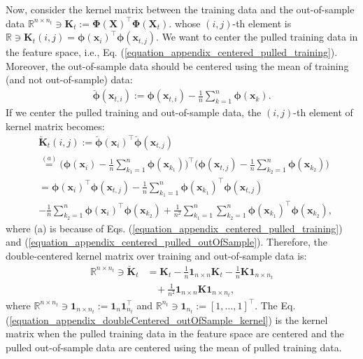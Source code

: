 \documentclass[lang=cn,10pt]{gorgeousnbook}
\numberwithin{equation}{section}%
\numberwithin{figure}{section}%
\begin{document}
Now, consider the kernel matrix between the training data and the out-of-sample data $\mathbb{R}^{n \times n_t} \ni \boldsymbol{K}_t := \boldsymbol{\Phi}(\boldsymbol{X})^\top \boldsymbol{\Phi}(\boldsymbol{X}_t)$.
whose $(i,j)$-th element is $\mathbb{R} \ni \boldsymbol{K}_t(i,j) = \boldsymbol{\phi}(\boldsymbol{x}_{i})^\top \boldsymbol{\phi}(\boldsymbol{x}_{t,j})$.
We want to center the pulled training data in the feature space, i.e., Eq. (\ref{equation_appendix_centered_pulled_training}). Moreover, the out-of-sample data should be centered using the mean of training (and not out-of-sample) data:
\begin{align}\label{equation_appendix_centered_pulled_outOfSample}
\breve{\boldsymbol{\phi}}(\boldsymbol{x}_{t,i}) := \boldsymbol{\phi}(\boldsymbol{x}_{t,i}) - \frac{1}{n} \sum_{k=1}^n \boldsymbol{\phi}(\boldsymbol{x}_k).
\end{align}
If we center the pulled training and out-of-sample data, the $(i,j)$-th element of kernel matrix becomes:
\begin{align*}
&\breve{\boldsymbol{K}}_t(i,j) := \breve{\boldsymbol{\phi}}(\boldsymbol{x}_i)^\top \breve{\boldsymbol{\phi}}(\boldsymbol{x}_{t,j}) \\
&\overset{(a)}{=} \! \big(\boldsymbol{\phi}(\boldsymbol{x}_i) - \frac{1}{n} \sum_{k_1=1}^n \boldsymbol{\phi}(\boldsymbol{x}_{k_1})\big)^\top \! \big(\boldsymbol{\phi}(\boldsymbol{x}_{t,j}) - \frac{1}{n} \sum_{k_2=1}^n \boldsymbol{\phi}(\boldsymbol{x}_{k_2})\big) \\
&= \boldsymbol{\phi}(\boldsymbol{x}_i)^\top \boldsymbol{\phi}(\boldsymbol{x}_{t,j}) - \frac{1}{n} \sum_{k_1=1}^n \boldsymbol{\phi}(\boldsymbol{x}_{k_1})^\top \boldsymbol{\phi}(\boldsymbol{x}_{t,j}) \\
& - \frac{1}{n} \sum_{k_2=1}^n \boldsymbol{\phi}(\boldsymbol{x}_i)^\top \boldsymbol{\phi}(\boldsymbol{x}_{k_2}) + \frac{1}{n^2} \! \sum_{k_1=1}^n  \sum_{k_2=1}^n \boldsymbol{\phi}(\boldsymbol{x}_{k_1})^\top \! \boldsymbol{\phi}(\boldsymbol{x}_{k_2}),
\end{align*}
where (a) is because of Eqs. (\ref{equation_appendix_centered_pulled_training}) and (\ref{equation_appendix_centered_pulled_outOfSample}).
Therefore, the double-centered kernel matrix over training and out-of-sample data is:
\begin{align}
\mathbb{R}^{n \times n_t} \ni \breve{\boldsymbol{K}}_t &= \boldsymbol{K}_t - \frac{1}{n} \boldsymbol{1}_{n \times n} \boldsymbol{K}_t - \frac{1}{n} \boldsymbol{K} \boldsymbol{1}_{n \times n_t} \nonumber \\
&~~~~ + \frac{1}{n^2} \boldsymbol{1}_{n \times n} \boldsymbol{K} \boldsymbol{1}_{n \times n_t}, \label{equation_appendix_doubleCentered_outOfSample_kernel}
\end{align}
where $\mathbb{R}^{n \times n_t} \ni \boldsymbol{1}_{n \times n_t} := \boldsymbol{1}_n \boldsymbol{1}_{n_t}^\top$ and $\mathbb{R}^{n_t} \ni \boldsymbol{1}_{n_t} := [1, \dots, 1]^\top$.
The Eq. (\ref{equation_appendix_doubleCentered_outOfSample_kernel}) is the kernel matrix when the pulled training data in the feature space are centered and the pulled out-of-sample data are centered using the mean of pulled training data.
\end{document}
